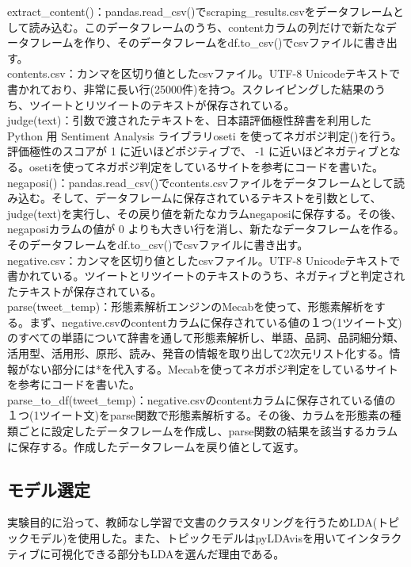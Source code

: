 \documentclass[a4paper, 11pt, titlepage]{jsarticle}
\begin{document}
extract\_content()：pandas.read\_csv()でscraping\_results.csvをデータフレームとして読み込む\cite{snscrape3}。このデータフレームのうち、contentカラムの列だけで新たなデータフレームを作り、そのデータフレームをdf.to\_csv()でcsvファイルに書き出す。\\
contents.csv：カンマを区切り値としたcsvファイル。UTF-8 Unicodeテキストで書かれており、非常に長い行(25000件)を持つ。スクレイピングした結果のうち、ツイートとリツイートのテキストが保存されている。\\
judge(text)：引数で渡されたテキストを、日本語評価極性辞書を利用したPython 用 Sentiment Analysis ライブラリoseti を使ってネガポジ判定()を行う\cite{negaposi1}。評価極性のスコアが 1 に近いほどポジティブで、 -1 に近いほどネガティブとなる。osetiを使ってネガポジ判定をしているサイトを参考にコードを書いた\cite{negaposi2}。\\
negaposi()：pandas.read\_csv()でcontents.csvファイルをデータフレームとして読み込む。そして、データフレームに保存されているテキストを引数として、judge(text)を実行し、その戻り値を新たなカラムnegaposiに保存する。その後、negaposiカラムの値が 0 よりも大きい行を消し、新たなデータフレームを作る。そのデータフレームをdf.to\_csv()でcsvファイルに書き出す。\\
negative.csv：カンマを区切り値としたcsvファイル。UTF-8 Unicodeテキストで書かれている。ツイートとリツイートのテキストのうち、ネガティブと判定されたテキストが保存されている。\\
parse(tweet\_temp)：形態素解析エンジンのMecabを使って、形態素解析をする\cite{keitaiso1}。まず、negative.csvのcontentカラムに保存されている値の１つ(1ツイート文)のすべての単語について辞書を通して形態素解析し、単語、品詞、品詞細分類、活用型、活用形、原形、読み、発音の情報を取り出して2次元リスト化する。情報がない部分には*を代入する。Mecabを使ってネガポジ判定をしているサイトを参考にコードを書いた\cite{keitaiso2}。\\
parse\_to\_df(tweet\_temp)：negative.csvのcontentカラムに保存されている値の１つ(1ツイート文)をparse関数で形態素解析する。その後、カラムを形態素の種類ごとに設定したデータフレームを作成し、parse関数の結果を該当するカラムに保存する。作成したデータフレームを戻り値として返す。\\

\subsection{モデル選定}
実験目的に沿って、教師なし学習で文書のクラスタリングを行うためLDA(トピックモデル)を使用した。また、トピックモデルはpyLDAvisを用いてインタラクティブに可視化できる部分もLDAを選んだ理由である。 
\end{document}
